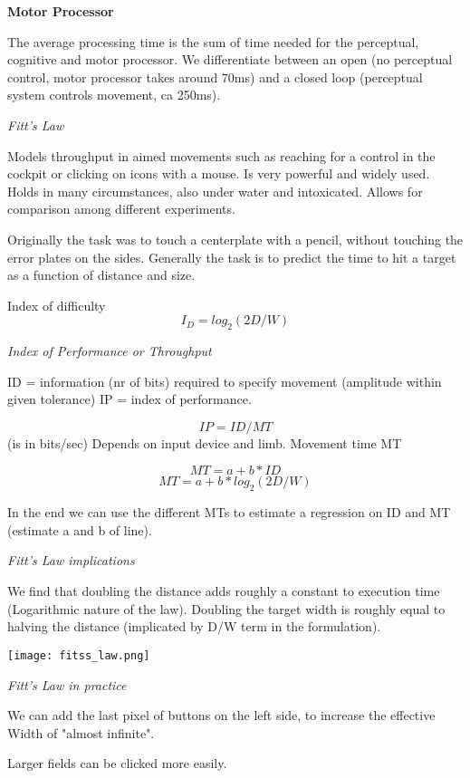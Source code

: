 \textbf{Motor Processor} \smallskip

The average processing time is the sum of time needed for the perceptual, cognitive and motor processor. We differentiate between an open (no perceptual control, motor processor takes around 70ms) and a closed loop (perceptual system controls movement, ca 250ms). \medskip

\textit{Fitt's Law} \smallskip

Models throughput in aimed movements such as reaching for a control in the cockpit or clicking on icons with a mouse. Is very powerful and widely used. Holds in many circumstances, also under water and intoxicated. Allows for comparison among different experiments. \medskip

Originally the task was to touch a centerplate with a pencil, without touching the error plates on the sides. Generally the task is to predict the time to hit a target as a function of distance and size. \medskip

Index of difficulty
$$I_D = log_2(2D/W)$$

\textit{Index of Performance or Throughput} \smallskip

ID = information (nr of bits) required to specify movement (amplitude within given tolerance)\smallskip
IP = index of performance. 

$$IP = ID / MT $$(is in bits/sec)
Depends on input device and limb. \smallskip
Movement time MT

$$MT = a + b * ID$$
$$MT = a + b *log_2(2D/W)$$

In the end we can use the different MTs to estimate a regression on ID and MT (estimate a and b of line). \medskip

\textit{Fitt's Law implications} \smallskip

We find that doubling the distance adds roughly a constant to execution time (Logarithmic nature of the law). Doubling the target width is roughly equal to halving the distance (implicated by D/W term in the formulation). \medskip

\begin{center}
	\texttt{[image: fitss\_law.png]}
\end{center}

\textit{Fitt's Law in practice} \smallskip

We can add the last pixel of buttons on the left side, to increase the effective Width of "almost infinite". \smallskip

Larger fields can be clicked more easily. \medskip

